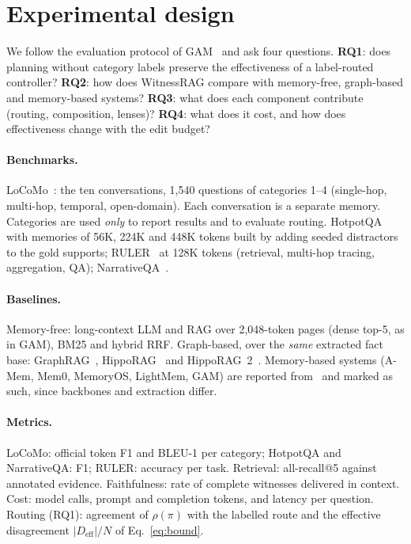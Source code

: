 \section{Experimental design}\label{sec:experiments}

We follow the evaluation protocol of GAM~\cite{yan2025gam} and ask four
questions.
\textbf{RQ1}: does planning without category labels preserve the
effectiveness of a label-routed controller?
\textbf{RQ2}: how does WitnessRAG compare with memory-free, graph-based and
memory-based systems?
\textbf{RQ3}: what does each component contribute (routing, composition,
lenses)?
\textbf{RQ4}: what does it cost, and how does effectiveness change with the
edit budget?

\paragraph{Benchmarks.}
LoCoMo~\cite{maharana2024locomo}: the ten conversations, 1{,}540 questions of
categories 1--4 (single-hop, multi-hop, temporal, open-domain). Each
conversation is a separate memory. Categories are used \emph{only} to report
results and to evaluate routing. HotpotQA~\cite{yang2018hotpotqa} with memories
of 56K, 224K and 448K tokens built by adding seeded distractors to the gold
supports; RULER~\cite{hsieh2024ruler} at 128K tokens (retrieval, multi-hop
tracing, aggregation, QA); NarrativeQA~\cite{kocisky2018narrativeqa}.

\paragraph{Baselines.}
Memory-free: long-context LLM and RAG over 2{,}048-token pages (dense top-5,
as in GAM), BM25 and hybrid RRF. Graph-based, over the \emph{same} extracted
fact base: GraphRAG~\cite{edge2024graphrag}, HippoRAG~\cite{gutierrez2024hipporag}
and HippoRAG~2~\cite{gutierrez2025hipporag2}. Memory-based systems (A-Mem,
Mem0, MemoryOS, LightMem, GAM) are reported from~\cite{yan2025gam} and marked
as such, since backbones and extraction differ.

\paragraph{Metrics.}
LoCoMo: official token F1 and BLEU-1 per category; HotpotQA and NarrativeQA:
F1; RULER: accuracy per task. Retrieval: all-recall@5 against annotated
evidence. Faithfulness: rate of complete witnesses delivered in context.
Cost: model calls, prompt and completion tokens, and latency per question.
Routing (RQ1): agreement of $\rho(\pi)$ with the labelled route and the
effective disagreement $|D_{\text{eff}}|/N$ of Eq.~\ref{eq:bound}.

